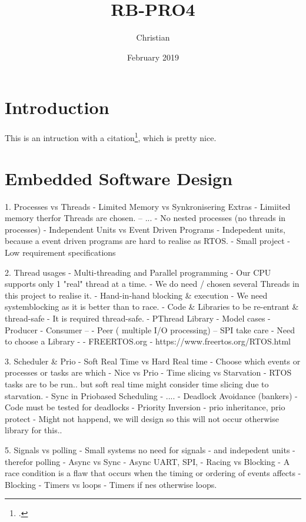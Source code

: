 \documentclass[11pt]{article}
\title{RB-PRO4}
\author{Christian}
\date{February 2019}
\begin{document}

\maketitle

\newpage
\tableofcontents

\newpage
{}

\section{Introduction}
This is an intruction with a citation\footcite[]{book}, which is pretty nice.

\section{Embedded Software Design}
1. Processes vs Threads
- Limited Memory vs Synkronisering Extras
    - Limiited memory therfor Threads are chosen. -- ...
    - No nested processes (no threads in processes)
- Independent Units vs Event Driven Programs
    - Indepedent units, because a event driven programs are hard to realise as RTOS.
    - Small project
    - Low requirement specifications

2. Thread usages
- Multi-threading and Parallel programming
    - Our CPU supports only 1 "real" thread at a time.
    - We do need / chosen several Threads in this project to realise it.
- Hand-in-hand blocking \& execution
    - We need systemblocking as it is better than to race.
- Code \& Libraries to be re-entrant \& thread-safe
    - It is required thread-safe.
- PThread Library
  - Model cases
    - Producer - Consumer --
    - Peer ( multiple I/O processing) -- SPI take care
    - Need to choose a Library -
    - FREERTOS.org - https://www.freertos.org/RTOS.html

3. Scheduler \& Prio
- Soft Real Time vs Hard Real time
    - Choose which events or processes or tasks are which
    - Nice vs Prio
- Time slicing vs Starvation
    - RTOS tasks are to be run.. but soft real time might consider time slicing due to starvation.
- Sync in Priobased Scheduling
    - ....
- Deadlock Avoidance (bankers)
    - Code must be tested for deadlocks
- Priority Inversion - prio inheritance, prio protect
    - Might not happend, we will design so this will not occur otherwise library for this..

5. Signals vs polling
    - Small systems no need for signals - and indepedent units - therefor polling
- Async vs Sync
    - Async UART, SPI,
- Racing vs Blocking - A race condition is a flaw that occurs when the timing or ordering of events affects
    - Blocking
- Timers vs loops
    - Timers if nes otherwise loops.
\end{document}
